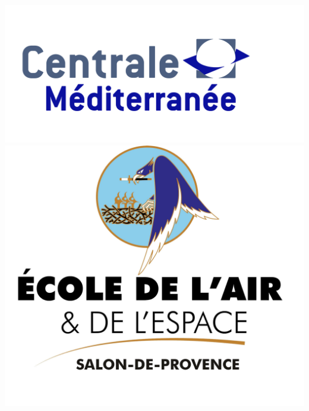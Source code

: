 \documentclass[a4paper, oneside, 12pt, final]{extreport}
\title{\reportSubject}
\author{\reportAuthor}
\begin{document}
\renewcommand\bibname{Bibliographie}
\renewcommand{\listfigurename}{Table des Figures}
\renewcommand{\listtablename}{Table des Tableaux}
\thispagestyle{empty}
\begin{titlepage}
\begin{center}


\vspace*{-3cm}
\includegraphics[scale=0.14]{assets/cm.jpg}
\hfill
\includegraphics[scale=0.1]{assets/eae.jpg}
\vspace{0.5cm}


\vspace{2cm}





\end{center}
\end{titlepage}
\end{document}
